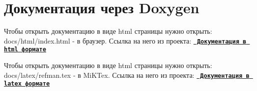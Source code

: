 \chapter{Документация через Doxygen}
\hypertarget{md_docs_2docs}{}\label{md_docs_2docs}
\label{md_docs_2docs_autotoc_md0}%
%


Чтобы открыть документацию в виде html страницы нужно открыть\+: docs/html/index.\+html -\/ в браузер. Ссылка на него из проекта\+: {\bfseries{\href{html/index.html}{\texttt{ Документация в html формате}}}}



Чтобы открыть документацию в виде html страницы нужно открыть\+: docs/latex/refman.\+tex -\/ в Mi\+KTex. Ссылка на него из проекта\+: {\bfseries{\href{latex/refman.tex}{\texttt{ Документация в latex формате}}}} 